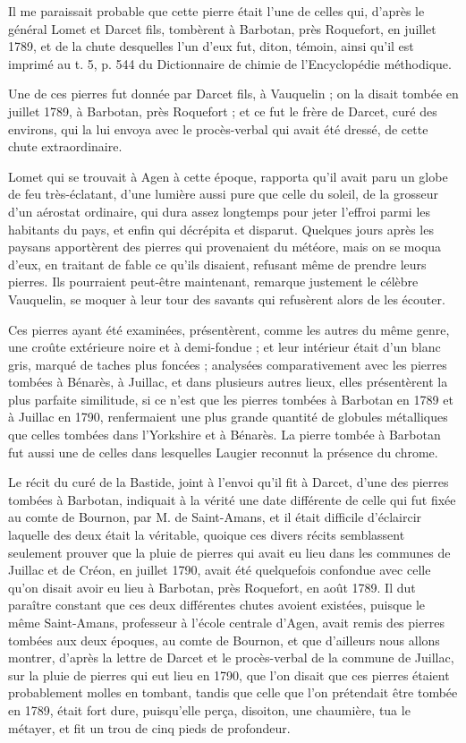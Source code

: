 \documentclass[a4paper, 12pt, oneside, french]{article}
\begin{document}
Il me paraissait probable que cette pierre était l'une de celles qui, d'après le général Lomet et Darcet fils, tombèrent à Barbotan, près Roquefort, en juillet 1789, et de la chute desquelles l'un d'eux fut, diton, témoin, ainsi qu'il est imprimé au t. 5, p. 544 du Dictionnaire de chimie de l'Encyclopédie méthodique.

Une de ces pierres fut donnée par Darcet fils, à Vauquelin ; on la disait tombée en juillet 1789, à Barbotan, près Roquefort ; et ce fut le frère de Darcet, curé des environs, qui la lui envoya avec le procès-verbal qui avait été dressé, de cette chute extraordinaire.

Lomet qui se trouvait à Agen à cette époque, rapporta qu'il avait paru un globe de feu très-éclatant, d'une lumière aussi pure que celle du soleil, de la grosseur d'un aérostat ordinaire, qui dura assez longtemps pour jeter l'effroi parmi les habitants du pays, et enfin qui décrépita et disparut. Quelques jours après les paysans apportèrent des pierres qui provenaient du météore, mais on se moqua d'eux, en traitant de fable ce qu'ils disaient, refusant même de prendre leurs pierres. Ils pourraient peut-être maintenant, remarque justement le célèbre Vauquelin, se moquer à leur tour des savants qui refusèrent alors de les écouter.

Ces pierres ayant été examinées, présentèrent, comme les autres du même genre, une croûte extérieure noire et à demi-fondue ; et leur intérieur était d'un blanc gris, marqué de taches plus foncées ; analysées comparativement avec les pierres tombées à Bénarès, à Juillac, et dans plusieurs autres lieux, elles présentèrent la plus parfaite similitude, si ce n'est que les pierres tombées à Barbotan en 1789 et à Juillac en 1790, renfermaient une plus grande quantité de globules métalliques que celles tombées dans l'Yorkshire et à Bénarès. La pierre tombée à Barbotan fut aussi une de celles dans lesquelles Laugier reconnut la présence du chrome.

Le récit du curé de la Bastide, joint à l'envoi qu'il fit à Darcet, d'une des pierres tombées à Barbotan, indiquait à la vérité une date différente de celle qui fut fixée au comte de Bournon, par M. de Saint-Amans, et il était difficile d'éclaircir laquelle des deux était la véritable, quoique ces divers récits semblassent seulement prouver que la pluie de pierres qui avait eu lieu dans les communes de Juillac et de Créon, en juillet 1790, avait été quelquefois confondue avec celle qu'on disait avoir eu lieu à Barbotan, près Roquefort, en août 1789. Il dut paraître constant que ces deux différentes chutes avoient existées, puisque le même Saint-Amans, professeur à l'école centrale d'Agen, avait remis des pierres tombées aux deux époques, au comte de Bournon, et que d'ailleurs nous allons montrer, d'après la lettre de Darcet et le procès-verbal de la commune de Juillac, sur la pluie de pierres qui eut lieu en 1790, que l'on disait que ces pierres étaient probablement molles en tombant, tandis que celle que l'on prétendait être tombée en 1789, était fort dure, puisqu'elle perça, disoiton, une chaumière, tua le métayer, et fit un trou de cinq pieds de profondeur.
\end{document}
